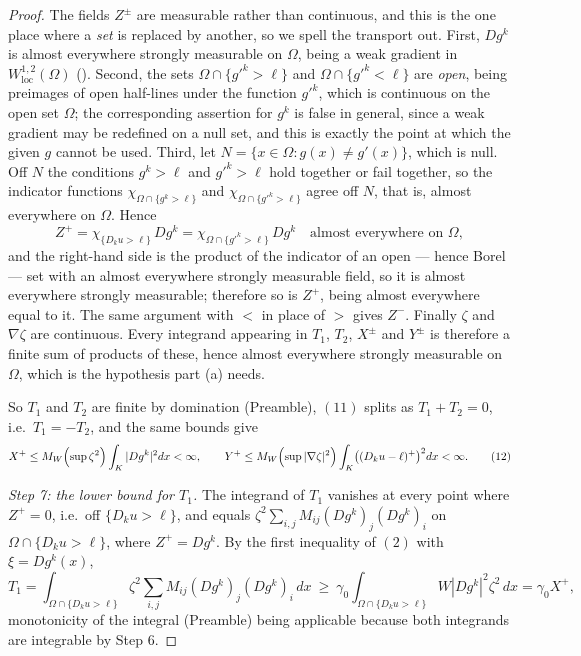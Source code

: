 \begin{proof}
The fields $Z^{\pm}$ are measurable rather than continuous, and this is the one
place where a \emph{set} is replaced by another, so we spell the transport out.
First, $Dg^k$ is almost everywhere strongly measurable on $\Omega$, being a weak
gradient in $W^{1,2}_{\mathrm{loc}}(\Omega)$ ().  Second,
the sets $\Omega\cap\{g'^k>\ell\}$ and $\Omega\cap\{g'^k<\ell\}$ are
\emph{open}, being preimages of open half-lines under the function $g'^k$, which
is continuous on the open set $\Omega$; the corresponding assertion for $g^k$ is
false in general, since a weak gradient may be redefined on a null set, and this
is exactly the point at which the given $g$ cannot be used.  Third, let
$N=\{x\in\Omega:g(x)\ne g'(x)\}$, which is null.  Off $N$ the conditions
$g^k>\ell$ and $g'^k>\ell$ hold together or fail together, so the indicator
functions $\chi_{\Omega\cap\{g^k>\ell\}}$ and $\chi_{\Omega\cap\{g'^k>\ell\}}$
agree off $N$, that is, almost everywhere on $\Omega$.  Hence
\[
Z^{+}=\chi_{\{D_ku>\ell\}}\,Dg^k
=\chi_{\Omega\cap\{g'^k>\ell\}}\,Dg^k
\quad\text{almost everywhere on }\Omega ,
\]
and the right-hand side is the product of the indicator of an open --- hence
Borel --- set with an almost everywhere strongly measurable field, so it is
almost everywhere strongly measurable; therefore so is $Z^{+}$, being almost
everywhere equal to it.  The same argument with $<$ in place of $>$ gives
$Z^{-}$.  Finally $\zeta$ and $\nabla\zeta$ are continuous.  Every integrand appearing in
$T_1$, $T_2$, $X^{\pm}$ and $Y^{\pm}$ is therefore a finite sum of products of
these, hence almost everywhere strongly measurable on $\Omega$, which is the
hypothesis part (a) needs.

So $T_1$ and $T_2$ are finite by domination
(Preamble), $(11)$ splits as $T_1+T_2=0$, i.e.\ $T_1=-T_2$, and the same
bounds give
\[
X^{+}\le M_W\Bigl(\sup\zeta^2\Bigr)\int_K|Dg^k|^2dx<\infty,
\qquad
Y^{+}\le M_W\Bigl(\sup|\nabla\zeta|^2\Bigr)\int_K\bigl((D_ku-\ell)^{+}\bigr)^2dx<\infty .
\tag{12}
\]

\emph{Step 7: the lower bound for $T_1$.}  The integrand of $T_1$ vanishes at
every point where $Z^{+}=0$, i.e.\ off $\{D_ku>\ell\}$, and equals
$\zeta^2\sum_{i,j}M_{ij}(Dg^k)_j(Dg^k)_i$ on $\Omega\cap\{D_ku>\ell\}$, where
$Z^{+}=Dg^k$.  By the first inequality of $(2)$ with $\xi=Dg^k(x)$,
\[
T_1=\int_{\Omega\cap\{D_ku>\ell\}}\zeta^2\sum_{i,j}M_{ij}(Dg^k)_j(Dg^k)_i\,dx
\ \ge\ \gamma_0\int_{\Omega\cap\{D_ku>\ell\}}W|Dg^k|^2\zeta^2\,dx=\gamma_0X^{+},
\]
monotonicity of the integral (Preamble) being applicable because both
integrands are integrable by Step 6.


\end{proof}

